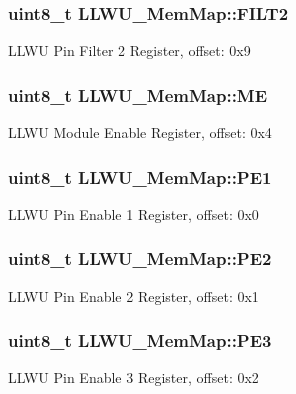 \subsubsection[{F\+I\+L\+T2}]{\setlength{\rightskip}{0pt plus 5cm}uint8\+\_\+t L\+L\+W\+U\+\_\+\+Mem\+Map\+::\+F\+I\+L\+T2}\label{struct_l_l_w_u___mem_map_a84fdf2d8e40d91c4ad620512aaca152b}
L\+L\+W\+U Pin Filter 2 Register, offset\+: 0x9 \hypertarget{struct_l_l_w_u___mem_map_ae8dea688fae93c1a5f9dd22b70cdc5cf}{}
\subsubsection[{M\+E}]{\setlength{\rightskip}{0pt plus 5cm}uint8\+\_\+t L\+L\+W\+U\+\_\+\+Mem\+Map\+::\+M\+E}\label{struct_l_l_w_u___mem_map_ae8dea688fae93c1a5f9dd22b70cdc5cf}
L\+L\+W\+U Module Enable Register, offset\+: 0x4 \hypertarget{struct_l_l_w_u___mem_map_abb0c4dd1142a84dc991e6dda4a8381d6}{}
\subsubsection[{P\+E1}]{\setlength{\rightskip}{0pt plus 5cm}uint8\+\_\+t L\+L\+W\+U\+\_\+\+Mem\+Map\+::\+P\+E1}\label{struct_l_l_w_u___mem_map_abb0c4dd1142a84dc991e6dda4a8381d6}
L\+L\+W\+U Pin Enable 1 Register, offset\+: 0x0 \hypertarget{struct_l_l_w_u___mem_map_a53d86f5153bce17f9927472da4fade5a}{}
\subsubsection[{P\+E2}]{\setlength{\rightskip}{0pt plus 5cm}uint8\+\_\+t L\+L\+W\+U\+\_\+\+Mem\+Map\+::\+P\+E2}\label{struct_l_l_w_u___mem_map_a53d86f5153bce17f9927472da4fade5a}
L\+L\+W\+U Pin Enable 2 Register, offset\+: 0x1 \hypertarget{struct_l_l_w_u___mem_map_a96a722e1ae66ee87b88407ef622cf243}{}
\subsubsection[{P\+E3}]{\setlength{\rightskip}{0pt plus 5cm}uint8\+\_\+t L\+L\+W\+U\+\_\+\+Mem\+Map\+::\+P\+E3}\label{struct_l_l_w_u___mem_map_a96a722e1ae66ee87b88407ef622cf243}
L\+L\+W\+U Pin Enable 3 Register, offset\+: 0x2 \hypertarget{struct_l_l_w_u___mem_map_a61ec3534039e161c5c71ea7f290f23d5}{}
